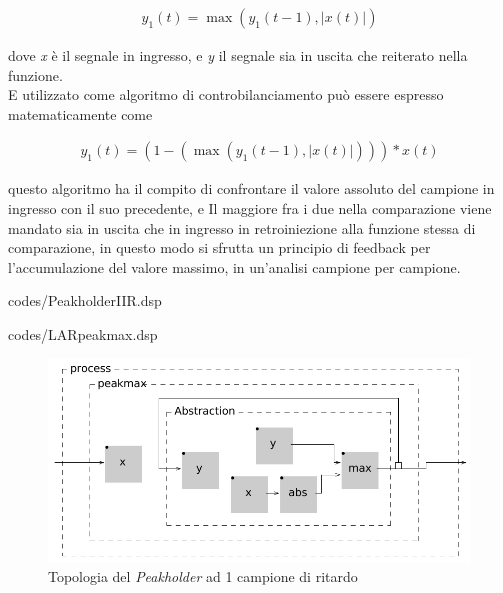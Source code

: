 \begin{align*} 
    y_{1}(t) = \max\left( y_{1}(t\!-\!1), \left\lvert{x(t)}\right\rvert \right) 
\end{align*}

dove \textit{x} è il segnale in ingresso, e \textit{y} il segnale sia in uscita che reiterato nella funzione. \\
E utilizzato come algoritmo di controbilanciamento può essere espresso matematicamente come

\begin{align*} 
    y_{1}(t) = (1-(\max\left( y_{1}(t\!-\!1), \left\lvert{x(t)}\right\rvert \right))) * x(t)
\end{align*}

questo algoritmo ha il compito di confrontare il valore assoluto del campione in ingresso con il suo precedente,
e Il maggiore fra i due nella comparazione viene mandato sia in uscita che in ingresso 
in retroiniezione alla funzione stessa di comparazione, 
in questo modo si sfrutta un principio di feedback per l'accumulazione
del valore massimo, in un'analisi campione per campione.

\vspace{0.5cm} 

{codes/PeakholderIIR.dsp}

\vspace{0.5cm} 

{codes/LARpeakmax.dsp}

\clearpage 

\begin{figure}[h!]
\begin{center}
    \includegraphics[width=14cm]{figures/PeakholderIIR.pdf}
    \caption{Topologia del \textit{Peakholder} ad 1 campione di ritardo} 
    \end{center}
\end{figure} 

